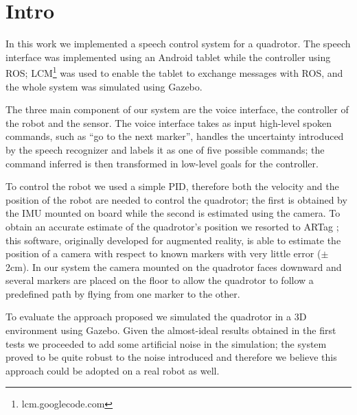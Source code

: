 \section{Intro}

In this work we implemented a speech control system for a quadrotor. The speech
interface was implemented using an Android tablet while the controller using
ROS; LCM\footnote{lcm.googlecode.com} was used to enable the tablet to exchange
messages with ROS, and the whole system was simulated using Gazebo.

The three main component of our system are the voice interface, the controller
of the robot and the sensor. The voice interface takes as input high-level
spoken commands, such as ``go to the next marker'', handles the uncertainty
introduced by the speech recognizer and labels it as one of five possible
commands; the command inferred is then transformed in low-level goals for the
controller.

 To control the robot we used a simple PID, therefore both the
velocity and the position of the robot are needed to control the quadrotor; the
first is obtained by the IMU mounted on board while the second is estimated
using the camera. To obtain an accurate estimate of the quadrotor's position we
resorted to ARTag \cite{ARTag}; this software, originally developed for
augmented reality, is able to estimate the position of a camera with respect to
known markers with very little error ($\pm$2cm). In our system the camera
mounted on the quadrotor faces downward and several markers are placed on the
floor to allow the quadrotor to follow a predefined path by flying from one
marker to the other.  

To evaluate the approach proposed we simulated the
quadrotor in a 3D environment using Gazebo. Given the almost-ideal results
obtained in the first tests we proceeded to add some artificial noise in the
simulation; the system proved to be quite robust to the noise introduced and
therefore we believe this approach could be adopted on a real robot as well.
